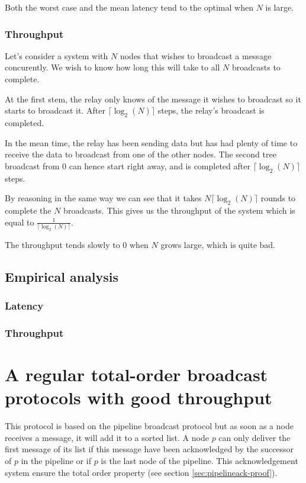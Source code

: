 \documentclass[a4paper]{article}
\begin{document}
Both the worst case and the mean latency tend to the optimal when $N$ is
large.

\subsubsection*{Throughput}
Let's consider a system with $N$ nodes that wishes to broadcast a message
concurently. We wish to know how long this will take to all $N$ broadcasts
to complete.

At the first stem, the relay only knows of the message it wishes to broadcast
so it starts to broadcast it. After $\lceil\log_2(N)\rceil$ steps, the relay's
broadcast is completed.

In the mean time, the relay has been sending data but has had plenty of time
to receive the data to broadcast from one of the other nodes. The second tree
broadcast from $0$ can hence start right away, and is completed after
$\lceil\log_2(N)\rceil$ steps.

By reasoning in the same way we can see that it takes $N \lceil\log_2(N)\rceil$
rounds to complete the $N$ broadcasts. This gives us the throughput of the
system which is equal to $\frac{1}{\lceil\log_2(N)\rceil}$.

The throughput tends slowly to $0$ when $N$ grows large, which is quite bad.

\subsection{Empirical analysis}

\subsubsection*{Latency}

\subsubsection*{Throughput}

\section{A regular total-order broadcast protocols with good throughput}
\label{sec:throughputTO}

This protocol is based on the pipeline broadcast protocol but as soon as a node
receives a message, it will add it to a sorted list. A node $p$ can only deliver the
first message of its list if this message have been acknowledged by the
successor of $p$ in the pipeline or if $p$ is the last node of the pipeline.
This acknowledgement system ensure the total order property (see section
\ref{sec:pipelineack-proof}).
\end{document}
